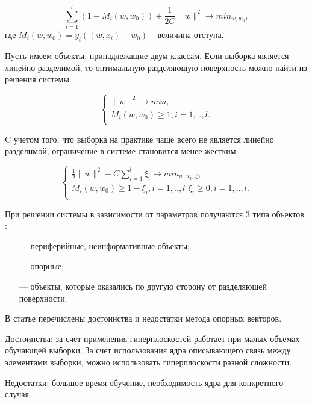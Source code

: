 \begin{equation}
	\sum\limits_{i=1}^{l}(1-M_{i}(w,w_{0})) + \frac{1}{2C}\|w\|^2 \rightarrow min_{w,w_{0}},
\end{equation}
где $M_i(w,w_0) = y_i((w, x_i) - w_0)$ -- величина отступа.

Пусть имеем объекты, принадлежащие двум классам. Если выборка является линейно разделимой, то оптимальную разделяющую поверхность можно
найти из решения системы:


\begin{equation}
	\begin{cases}
		\|w\|^2 \rightarrow min,\\
		M_i(w,w_0) \geq 1, i = 1, .., l. \\
	\end{cases}
\end{equation}

C учетом того, что выборка на практике чаще всего не является линейно
разделимой, ограничение в системе становится менее жестким:

\begin{equation}
	\begin{cases}
		\frac{1}{2}\|w\|^2 + C 	\sum\limits_{i=1}^{l} \xi_{i}\rightarrow min_{w,w_{0},\xi},\\
		M_i(w,w_0) \geq 1 - \xi_{i}, i = 1, .., l\,\
		\xi_{i} \geq 0, i = 1, .., l. \\
	\end{cases}
\end{equation}

При решении системы в зависимости от параметров получаются 3 типа объектов \cite{vec}:

\begin{itemize}
	\item[---] периферийные, неинформативные объекты;
	\item[---] опорные;
	\item[---] объекты, которые оказались по другую сторону от разделяющей поверхности.
	
\end{itemize}

В статье \cite{baes2} перечислены достоинства и недостатки метода опорных векторов.

Достоинства: за счет применения гиперплоскостей работает при малых объемах обучающей выборки. За счет использования ядра
описывающего связь между элементами выборки, можно использовать гиперплоскости разной
сложности.

Недостатки: большое время обучение, необходимость ядра для конкретного случая.


